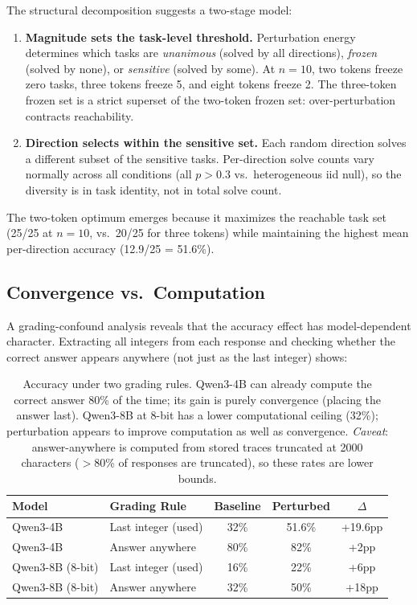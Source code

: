 \documentclass{article}
\begin{document}
The structural decomposition suggests a two-stage model:
\begin{enumerate}
    \item \textbf{Magnitude sets the task-level threshold.}
    Perturbation energy determines which tasks are \emph{unanimous}
    (solved by all directions), \emph{frozen} (solved by none), or
    \emph{sensitive} (solved by some). At $n = 10$, two tokens freeze
    zero tasks, three tokens freeze 5, and eight tokens freeze 2.
    The three-token frozen set is a strict superset of the two-token
    frozen set: over-perturbation contracts reachability.

    \item \textbf{Direction selects within the sensitive set.}
    Each random direction solves a different subset of the sensitive
    tasks. Per-direction solve counts vary normally across all
    conditions (all $p > 0.3$ vs.\ heterogeneous iid null), so the
    diversity is in task identity, not in total solve count.
\end{enumerate}

The two-token optimum emerges because it maximizes the reachable task
set (25/25 at $n = 10$, vs.\ 20/25 for three tokens) while maintaining
the highest mean per-direction accuracy (12.9/25 = 51.6\%).

\subsection{Convergence vs.\ Computation}

A grading-confound analysis reveals that the accuracy effect has
model-dependent character. Extracting all integers from each response
and checking whether the correct answer appears anywhere (not just as
the last integer) shows:

\begin{table}[h]
\centering
\begin{tabular}{llccc}
\toprule
\textbf{Model} & \textbf{Grading Rule} & \textbf{Baseline} & \textbf{Perturbed} & \textbf{$\Delta$} \\
\midrule
Qwen3-4B & Last integer (used) & 32\% & 51.6\% & +19.6pp \\
Qwen3-4B & Answer anywhere & 80\% & 82\% & +2pp \\
\midrule
Qwen3-8B (8-bit) & Last integer (used) & 16\% & 22\% & +6pp \\
Qwen3-8B (8-bit) & Answer anywhere & 32\% & 50\% & +18pp \\
\bottomrule
\end{tabular}
\caption{Accuracy under two grading rules. Qwen3-4B can already compute
the correct answer 80\% of the time; its gain is purely convergence
(placing the answer last). Qwen3-8B at 8-bit has a lower computational
ceiling (32\%); perturbation appears to improve computation as well as
convergence. \emph{Caveat}: answer-anywhere is computed from stored
traces truncated at 2000 characters ($>$80\% of responses are
truncated), so these rates are lower bounds.}
\label{tab:convergence}
\end{table}
\end{document}
